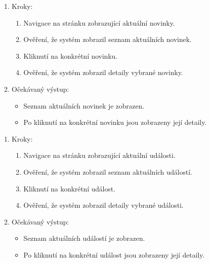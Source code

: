 
\begin{enumerate}
  \item Kroky:
    \begin{enumerate}
      \item Navigace na stránku zobrazující aktuální novinky.
      \item Ověření, že systém zobrazil seznam aktuálních novinek.
      \item Kliknutí na konkrétní novinku.
      \item Ověření, že systém zobrazil detaily vybrané novinky.
    \end{enumerate}
  \item Očekávaný výstup:
    \begin{itemize}
      \item Seznam aktuálních novinek je zobrazen.
      \item Po kliknutí na konkrétní novinku jsou zobrazeny její detaily.
    \end{itemize}
\end{enumerate}


\begin{enumerate}
  \item Kroky:
    \begin{enumerate}
      \item Navigace na stránku zobrazující aktuální události.
      \item Ověření, že systém zobrazil seznam aktuálních událostí.
      \item Kliknutí na konkrétní událost.
      \item Ověření, že systém zobrazil detaily vybrané události.
    \end{enumerate}
  \item Očekávaný výstup:
    \begin{itemize}
      \item Seznam aktuálních událostí je zobrazen.
      \item Po kliknutí na konkrétní událost jsou zobrazeny její detaily.
    \end{itemize}
\end{enumerate}



